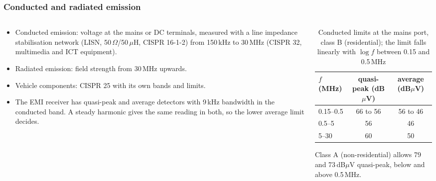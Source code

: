 \begin{frame}
	\frametitle{Conducted and radiated emission}
	\begin{columns}[T]
		\begin{column}{0.5\textwidth}
			\small
			\begin{itemize}
				\item Conducted emission: voltage at the mains or DC terminals, measured with a line impedance stabilisation network (LISN, 50\,$\Omega$/50\,$\mu$H, CISPR 16-1-2) from 150\,kHz to 30\,MHz (CISPR 32, multimedia and ICT equipment).
				\item Radiated emission: field strength from 30\,MHz upwards.
				\item Vehicle components: CISPR 25 with its own bands and limits.
				\item The EMI receiver has quasi-peak and average detectors with 9\,kHz bandwidth in the conducted band. A steady harmonic gives the same reading in both, so the lower average limit decides.
			\end{itemize}
		\end{column}
		\begin{column}{0.47\textwidth}
			\begin{table}
				\centering
				\scriptsize
				\begin{tabular}{|l|c|c|}
					\hline
					$f$ (MHz)  & quasi-peak (dB$\mu$V) & average (dB$\mu$V) \\
					\hline
					0.15--0.5  & 66 to 56              & 56 to 46           \\
					0.5--5     & 56                    & 46                 \\
					5--30      & 60                    & 50                 \\
					\hline
				\end{tabular}
				\caption{Conducted limits at the mains port, class B (residential); the limit falls linearly with $\log f$ between 0.15 and 0.5\,MHz}
			\end{table}
			\small
			Class A (non-residential) allows 79 and 73\,dB$\mu$V quasi-peak, below and above 0.5\,MHz.
		\end{column}
	\end{columns}
\end{frame}

